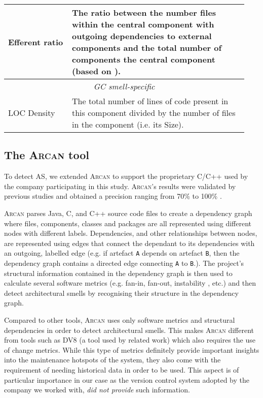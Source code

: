 \begin{table}[tbp]
\begin{tabular}{p{0.25\linewidth}|p{0.69\linewidth}}
        Efferent ratio & The ratio between the number files within the central component with outgoing dependencies to external components and the total number of components the central component (based on \cite{Abdeen2011}). \\\midrule
        \multicolumn{2}{c}{\itshape GC smell-specific}\\\midrule
        LOC Density & The total number of lines of code present in this component divided by the number of files in the component (i.e. its Size). \\ \bottomrule
    \end{tabular}
\end{table}

\subsection{The \textsc{Arcan} tool}
To detect AS, we extended \textsc{Arcan} to support the proprietary C/C++ used by the company participating in this study. 
\textsc{Arcan}'s results were validated by previous studies and obtained a precision ranging from 70\% to 100\% \cite{Arcelli2020,Arcelli2017}.

\textsc{Arcan} parses Java, C, and C++ source code files to create a dependency graph where files, components, classes and packages are all represented using different nodes with different labels. Dependencies, and other relationships between nodes, are represented using edges that connect the dependant to its dependencies with an outgoing, labelled edge (e.g. if artefact \texttt{A} depends on artefact \texttt{B}, then the dependency graph contains a directed edge connecting \texttt{A} to \texttt{B}.). 
The project's structural information contained in the dependency graph is then used to calculate several software metrics (e.g. fan-in, fan-out, instability \cite{Martin2018}, etc.) and then detect architectural smells by recognising their structure in the dependency graph.

Compared to other tools, \textsc{Arcan} uses only software metrics and structural dependencies in order to detect architectural smells. 
This makes \textsc{Arcan} different from tools such as DV8 \cite{Mo2015} (a tool used by related work) which also requires the use of change metrics.
While this type of metrics definitely provide important insights into the maintenance hotspots of the system, they also come with the requirement of needing historical data in order to be used.
This aspect is of particular importance in our case as the version control system adopted by the company we worked with, \emph{did not provide} such information.

